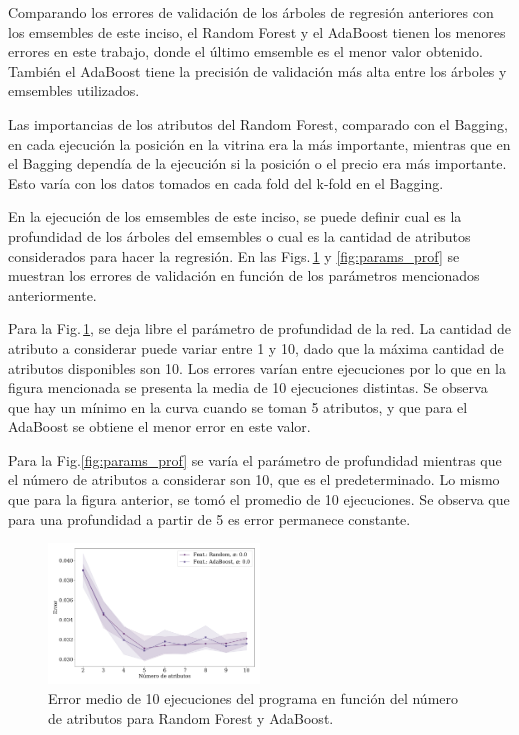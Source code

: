 Comparando  los errores de validación de los árboles de regresión anteriores con los emsembles de este inciso, el Random Forest y el AdaBoost tienen los menores errores en este trabajo, donde el último emsemble es el menor valor obtenido. También el AdaBoost tiene la precisión de validación más alta entre los árboles y emsembles utilizados.

Las importancias de los atributos  del Random Forest, comparado con el Bagging, en cada ejecución la posición en  la vitrina era la más importante, mientras que en el Bagging dependía de la ejecución si la posición o el precio era más importante. Esto varía con los datos tomados en cada fold del k-fold en el Bagging.


En la ejecución de los emsembles de este inciso, se puede definir cual es la profundidad de los árboles del emsembles o cual es la cantidad de atributos considerados para hacer la regresión. En las Figs.\,\ref{fig:params_feat} y \ref{fig:params_prof} se muestran los errores de validación en función de los parámetros mencionados anteriormente.


Para la Fig.\,\ref{fig:params_feat}, se deja libre el parámetro de profundidad de la red. La cantidad de atributo a considerar puede variar entre 1 y 10, dado que la máxima cantidad de atributos disponibles son 10. Los errores varían entre ejecuciones por lo que en la figura mencionada se presenta la media de 10 ejecuciones distintas. Se  observa que hay un mínimo en la curva cuando se toman 5 atributos, y que para el AdaBoost se obtiene el menor error en este valor.

Para la Fig.\ref{fig:params_prof} se varía el parámetro de profundidad mientras que el número de atributos a considerar son 10, que es el predeterminado. Lo mismo que para la figura anterior, se tomó el promedio de 10 ejecuciones. Se observa que para una profundidad a partir de 5 es error permanece constante.

\begin{figure}[H]
	\begin{small}
		\begin{center}
			\includegraphics[width=0.5\textwidth]{figures/err_feat_item_gh.pdf}
		\end{center}
		\caption{Error medio de 10 ejecuciones del programa en función del número de atributos para Random Forest y AdaBoost.}
		\label{fig:params_feat}
	\end{small}
\end{figure}

